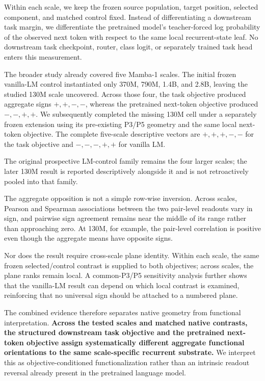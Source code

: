 \documentclass{article}
\begin{document}
Within each scale, we keep the frozen source population, target position, selected component, and matched control fixed. Instead of differentiating a downstream task margin, we differentiate the pretrained model's teacher-forced log probability of the observed next token with respect to the same local recurrent-state leaf. No downstream task checkpoint, router, class logit, or separately trained task head enters this measurement.

The broader study already covered five Mamba-1 scales. The initial frozen vanilla-LM control instantiated only 370M, 790M, 1.4B, and 2.8B, leaving the studied 130M scale uncovered. Across those four, the task objective produced aggregate signs $+,+,-,-$, whereas the pretrained next-token objective produced $-,-,+,+$. We subsequently completed the missing 130M cell under a separately frozen extension using its pre-existing P3/P5 geometry and the same local next-token objective. The complete five-scale descriptive vectors are $+,+,+,-,-$ for the task objective and $-,-,-,+,+$ for vanilla LM.

The original prospective LM-control family remains the four larger scales; the later 130M result is reported descriptively alongside it and is not retroactively pooled into that family.

The aggregate opposition is not a simple row-wise inversion. Across scales, Pearson and Spearman associations between the two pair-level readouts vary in sign, and pairwise sign agreement remains near the middle of its range rather than approaching zero. At 130M, for example, the pair-level correlation is positive even though the aggregate means have opposite signs.

Nor does the result require cross-scale plane identity. Within each scale, the same frozen selected/control contrast is supplied to both objectives; across scales, the plane ranks remain local. A common-P3/P5 sensitivity analysis further shows that the vanilla-LM result can depend on which local contrast is examined, reinforcing that no universal sign should be attached to a numbered plane.

The combined evidence therefore separates native geometry from functional interpretation. \textbf{Across the tested scales and matched native contrasts, the structured downstream task objective and the pretrained next-token objective assign systematically different aggregate functional orientations to the same scale-specific recurrent substrate.} We interpret this as objective-conditioned functionalization rather than an intrinsic readout reversal already present in the pretrained language model.
\end{document}

